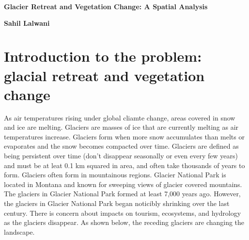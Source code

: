 \documentclass[11pt]{article}
\begin{document}
\pagestyle{empty}    %

\centerline{\bf Glacier Retreat and Vegetation Change: A Spatial Analysis}
\normalsize
\centerline{\bf Sahil Lalwani }      

\section*{Introduction to the problem: glacial retreat and vegetation change}

As air temperatures rising under global cliamte change, areas covered in snow and ice are melting. Glaciers are masses of ice that are currently melting as air temperatures increase. Glaciers form when more snow accumulates than melts or evaporates and the snow becomes compacted over time. Glaciers are defined as being persistent over time (don’t disappear seasonally or even every few years) and must be at leat 0.1 km squared in area, and often take thousands of years to form. Glaciers often form in mountainous regions. Glacier National Park is located in Montana and known for sweeping views of glacier covered mountains. The glaciers in Glacier National Park formed at least 7,000 years ago. However, the glaciers in Glacier National Park began noticibly shrinking over the last century. There is concern about impacts on tourism, ecosystems, and hydrology as the glaciers disappear. As shown below, the receding glaciers are changing the landscape.
\end{document}

